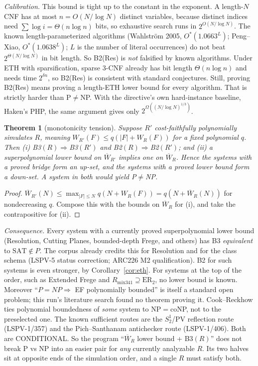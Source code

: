 \documentclass[11pt]{article}
\newtheorem{theorem}{Theorem}
\theoremstyle{definition}
\newcommand{\Wb}{\overline W}
\begin{document}
\noindent\emph{Calibration.} This bound is tight up to the constant in the
exponent. A length-$N$ CNF has at most $n=O(N/\log N)$ distinct variables,
because distinct indices need $\sum\log i=\Theta(n\log n)$ bits, so exhaustive
search runs in $2^{O(N/\log N)}$. The known length-parameterized algorithms
(Wahlstr\"om 2005, $O^*(1.0663^L)$; Peng--Xiao, $O^*(1.0638^L)$; $L$ is the
number of literal occurrences) do not beat $2^{\Theta(N/\log N)}$ in bit
length. So B2(Res) is \emph{not} falsified by known algorithms. Under ETH
with sparsification, sparse 3-CNF already has bit length $\Theta(n\log n)$
and needs time $2^{\delta n}$, so B2(Res) is consistent with standard
conjectures. Still, proving B2(Res) means proving a length-ETH lower bound
for every algorithm. That is strictly harder than P$\ne$NP. With the
directive's own hard-instance baseline, Haken's PHP, the same argument gives
only $2^{\Omega((N/\log N)^{1/3})}$.

\begin{theorem}[monotonicity tension]\label{thm:mono}
Suppose $R'$ cost-faithfully polynomially simulates $R$, meaning
$W_{R'}(F)\le q(|F|+W_R(F))$ for a fixed polynomial $q$. Then
(i) B3$(R)\Rightarrow$B3$(R')$ and B2$(R)\Rightarrow$B2$(R')$; and
(ii) a superpolynomial lower bound on $\Wb_{R'}$ implies one on $\Wb_R$.
Hence the systems with a proved bridge form an up-set, and the systems with
a proved lower bound form a down-set. A system in both would yield
P$\ne$NP.
\end{theorem}
\begin{proof}
$\Wb_{R'}(N)\le\max_{|F|\le N}q(N+W_R(F))=q(N+\Wb_R(N))$ for nondecreasing
$q$. Compose this with the bounds on $\Wb_R$ for (i), and take the
contrapositive for (ii).
\end{proof}

\noindent\emph{Consequence.} Every system with a currently proved
superpolynomial lower bound (Resolution, Cutting Planes, bounded-depth Frege,
and others) has B3 \emph{equivalent} to $\mathrm{SAT}\notin P$. The corpus
already credits this for Resolution and for the class schema (LSPV-5 status
correction; ARC226 M2 qualification). B2 for such systems is even stronger,
by Corollary~\ref{cor:eth}. For systems at the top of the order, such as
Extended Frege and $R_{\mathrm{mix341}}\supseteq\mathrm{ER}_2$, no lower bound
is known. Moreover ``$P=NP\Rightarrow$ EF polynomially bounded'' is itself a
standard open problem; this run's literature search found no theorem proving
it. Cook--Reckhow ties polynomial boundedness of \emph{some} system to
NP$=$coNP, not to the preselected one. The known sufficient routes are the
$S^1_2$/PV reflection route (LSPV-1/357) and the Pich--Santhanam antichecker
route (LSPV-1/406). Both are CONDITIONAL. So the program
``$\Wb_R$ lower bound + B3$(R)$'' does not break P vs NP into an easier pair
for \emph{any} currently analyzable $R$. Its two halves sit at opposite ends
of the simulation order, and a single $R$ must satisfy both.
\end{document}

